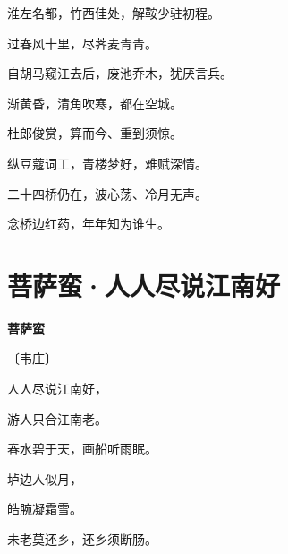 \documentclass[12pt,UTF-8,openany,fontset=none]{ctexbook}
\begin{document}
\begin{center}
    \begin{Large}

        淮左名都，竹西佳处，解鞍少驻初程。

        过春风十里，尽荠麦青青。

        自胡马窥江去后，废池乔木，犹厌言兵。

        渐黄昏，清角吹寒，都在空城。

        \vspace{18pt}  %

        杜郎俊赏，算而今、重到须惊。

        纵豆蔻词工，青楼梦好，难赋深情。

        二十四桥仍在，波心荡、冷月无声。

        念桥边红药，年年知为谁生。

    \end{Large}

\end{center}

\vspace{8pt}
\clearpage

\section{菩萨蛮·人人尽说江南好}


\begin{center}
    {\bfseries 菩萨蛮}

    \vspace{18pt}

    \begin{large}\xuwen
        〔韦庄〕
    \end{large}

\end{center}

    \vspace{18pt}  %

\begin{center}
    \begin{Large}

        人人尽说江南好，

        游人只合江南老。

        春水碧于天，画船听雨眠。

        \vspace{18pt}  %

        垆边人似月，

        皓腕凝霜雪。

        未老莫还乡，还乡须断肠。

    \end{Large}

\end{center}
\end{document}
